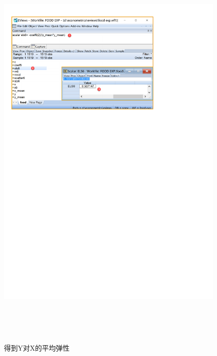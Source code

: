 \documentclass[12pt,(landscape,a4paper),(portrait,a4paper)]{article}
\begin{document}
\begin{figure}

{\centering \includegraphics[width=24.22in,height=8in]{picture/lab3-model-function/elasticity6} 

}

\caption{得到Y对X的平均弹性}\label{fig:elasticity6}
\end{figure}
\end{document}
